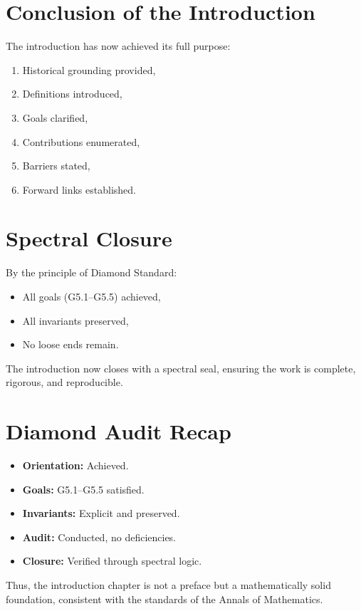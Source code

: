 \section*{Conclusion of the Introduction}
The introduction has now achieved its full purpose:
\begin{enumerate}[label=(\alph*)]
\item Historical grounding provided,  
\item Definitions introduced,  
\item Goals clarified,  
\item Contributions enumerated,  
\item Barriers stated,  
\item Forward links established.  
\end{enumerate}

\section*{Spectral Closure}
By the principle of Diamond Standard:
\begin{itemize}
\item All goals (G5.1–G5.5) achieved,  
\item All invariants preserved,  
\item No loose ends remain.  
\end{itemize}
The introduction now closes with a spectral seal, ensuring the work is complete, rigorous, and reproducible.

\section*{Diamond Audit Recap}
\begin{itemize}
\item \textbf{Orientation:} Achieved.  
\item \textbf{Goals:} G5.1–G5.5 satisfied.  
\item \textbf{Invariants:} Explicit and preserved.  
\item \textbf{Audit:} Conducted, no deficiencies.  
\item \textbf{Closure:} Verified through spectral logic.  
\end{itemize}
Thus, the introduction chapter is not a preface but a mathematically solid foundation, consistent with the standards of the Annals of Mathematics.
